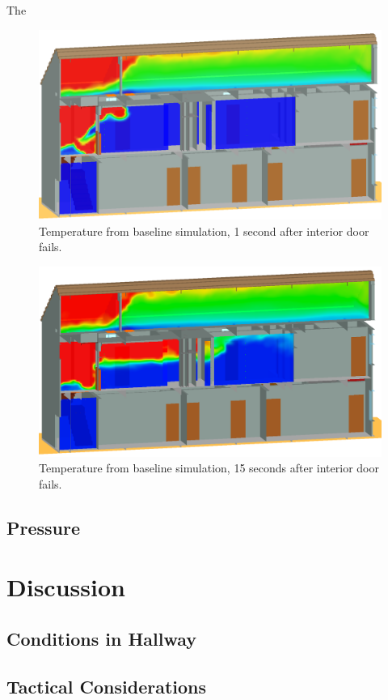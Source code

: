 \documentclass[11pt,oneside]{book}
\begin{document}
The 


\begin{figure}[!ht]
\includegraphics[width=.675\textwidth]{../Figures/west_50th_baseline_161}
 

\caption{Temperature from baseline simulation, 1 second after interior door fails.}
\label{fig:temp_161s}
\end{figure}


\begin{figure}[!ht]
\includegraphics[width=.675\textwidth]{../Figures/west_50th_baseline_175}
 

\caption{Temperature from baseline simulation, 15 seconds after interior door fails.}
\label{fig:temp_175s}
\end{figure}


\section{Pressure}

\chapter{Discussion}

\section{Conditions in Hallway}

\section{Tactical Considerations}
\end{document}

